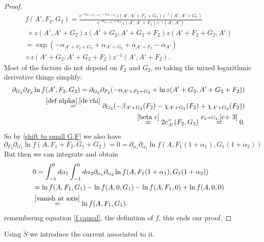 \documentclass[b5paper,draft,openbib,12pt]{memoir}
\newtheorem{Def}{Definition}
\begin{document}
\begin{proof}
\begin{align}
f(A',F_2,G_2)=\frac{e^{-\alpha_{A'+F_2+G_2}+\alpha_{A'+G_2}}z(A',A'+F_2+G_2)z^{-1}(A',A'+G_2)}{e^{-\alpha_{A'+F_2}+\alpha_{A'}}z(A',A'+F_2)z^{-1}(A',A')}  \\\
\times z(A',A'+G_2)z(A'+G_2,A'+G_2+F_2)z(A'+F_2+G_2,A')\\
=\exp(-\alpha_{A'+F_2+G_2}+\alpha_{A'+G_2}+\alpha_{A'+F_2}-\alpha_{A'})\\
\times z(A'+G_2,A'+G_2+F_2)z^{-1}(A',A'+F_2).
\end{align}
Most of the factors do not depend on \(F_2\) and \(G_2\), so taking the mixed logarithmic derivative things simplify:
\begin{align}
\partial_{G_2}\partial_{F_2} \ln f(A',F_2,G_2)= \partial_{G_2}\partial_{F_2} ( -\alpha_{A'+F_2+G_2} + \ln z(A'+G_2,A'+G_2+F_2))\\
\overset{\eqref{def alpha}, \eqref{de chi}}{=}  \partial_{G_2} (-\beta_{A'+G_2}(F_2)-\chi_{A'+G_2}(F_2) + \chi_{A'+G_2}(F_2))\\
\overset{\eqref{beta c}}{=}2 c^+_{A'}(F_2,G_2)\overset{F_2\prec G_2, \eqref{c+ 3}}{=}0.
\end{align}
So by \eqref{shift to small G,F} we also have
\begin{equation}
\partial_{F_2}\partial_{G_2}\ln f(A,F_1+F_2,G_1+G_2)=0=\partial_{\alpha_1}\partial_{\alpha_2}\ln f(A,F_1(1+\alpha_1),G_1(1+\alpha_2))
\end{equation}
But then we can integrate and obtain
\begin{align}
&0=\int_{-1}^0d \alpha_1 \int_{-1}^0d \alpha_2  \partial_{\alpha_1}\partial_{\alpha_2}\ln f(A,F_1(1+\alpha_1),G_1(1+\alpha_2))\\
&=\ln f(A,F_1,G_1)-\ln f(A,0,G_1)-\ln f(A,F_1,0) + \ln f(A,0,0)\\
&\overset{\eqref{vanish at axis}}{=}\ln f(A,F_1,G_1).
\end{align}
remembering equation \eqref{f causal}, the definition of \(f\),  this ends our proof.
\end{proof}

Using \(\tilde{S}\) we introduce the current associated to it.

\end{document}
